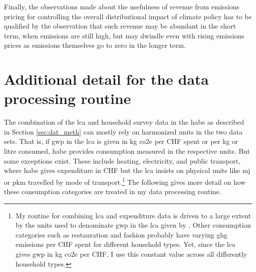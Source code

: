 \documentclass[a4paper,11pt,abstract=true]{scrartcl}
\begin{document}

Finally, the observations made about the usefulness of revenue from emissions pricing for controlling the overall distributional impact of climate policy has to be qualified by the observation that such revenue may be abundant in the short term, when emissions are still high, but may dwindle even with rising emissions prices as emissions themselves go to zero in the longer term.

\clearpage

\printbibliography

\clearpage

\appendix
\renewcommand{\thesection}{Appendix~\Alph{section}}

\section{Additional detail for the data processing routine}
\label{app:hhdata}

The combination of the \ac{lca} and household survey data in the \ac{habe} as described in Section \ref{sec:dat_meth} can mostly rely on harmonized units in the two data sets.
That is, if \ac{gwp} in the \ac{lca} is given in kg \ac{co2e} per CHF spent or per kg or litre consumed, \ac{habe} provides consumption measured in the respective units.
But some exceptions exist.
These include heating, electricity, and public transport, where \ac{habe} gives expenditure in CHF but the \ac{lca} insists on physical units like \ac{mj} or \ac{pkm} travelled by mode of transport.\footnote{%
  My routine for combining \ac{lca} and expenditure data is driven to a large extent by the units used to denominate \ac{gwp} in the \ac{lca} given by \citet{jakobs_nfp73_2023}.
  Other consumption categories such as restauration and fashion probably have varying \ac{ghg} emissions per CHF spent for different household types.
  Yet, since the \ac{lca} gives \ac{gwp} in kg \ac{co2e} per CHF, I use this constant value across all differently household types.
}
The following gives more detail on how these consumption categories are treated in my data processing routine.
\end{document}
